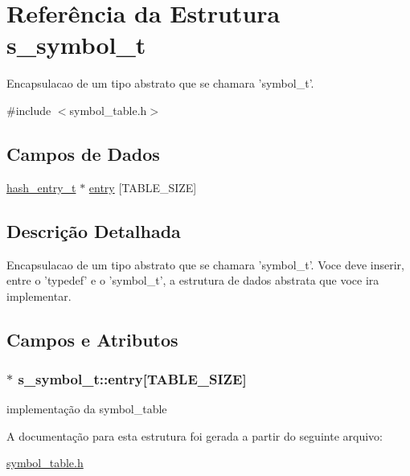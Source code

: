 \hypertarget{structs__symbol__t}{
\section{Referência da Estrutura s\_\-symbol\_\-t}
\label{structs__symbol__t}
}


Encapsulacao de um tipo abstrato que se chamara 'symbol\_\-t'.  


{\ttfamily \#include $<$symbol\_\-table.h$>$}\subsection*{Campos de Dados}
\begin{DoxyCompactItemize}
\item 
\hyperlink{structhash__entry__t}{hash\_\-entry\_\-t} $\ast$ \hyperlink{structs__symbol__t_a6d642ada3db576f0121df93108418527}{entry} \mbox{[}TABLE\_\-SIZE\mbox{]}
\end{DoxyCompactItemize}


\subsection{Descrição Detalhada}
Encapsulacao de um tipo abstrato que se chamara 'symbol\_\-t'. Voce deve inserir, entre o 'typedef' e o 'symbol\_\-t', a estrutura de dados abstrata que voce ira implementar. 

\subsection{Campos e Atributos}
\hypertarget{structs__symbol__t_a6d642ada3db576f0121df93108418527}{
\subsubsection[{entry}]{$\ast$ {\bf s\_\-symbol\_\-t::entry}\mbox{[}TABLE\_\-SIZE\mbox{]}}}
\label{structs__symbol__t_a6d642ada3db576f0121df93108418527}
implementação da symbol\_\-table 

A documentação para esta estrutura foi gerada a partir do seguinte arquivo:\begin{DoxyCompactItemize}
\item 
\hyperlink{symbol__table_8h}{symbol\_\-table.h}\end{DoxyCompactItemize}
